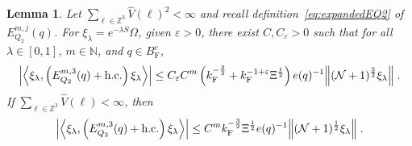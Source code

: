 \documentclass[12pt,a4paper]{article}
\numberwithin{equation}{section}
\newcommand{\NNN}{\mathbb{N}}
\newcommand{\1}{\mathbb{I}}
\newcommand{\F}{\mathrm{F}}
\newcommand{\Zstar}{\mathbb{Z}^3} %
\newcommand{\Z}{\mathbb{Z}}
\newcommand{\NN}{\mathcal{N}}
\newcommand{\half}{\frac{1}{2}}
\newcommand{\eva}[1]{\left\langle #1 \right\rangle}
\theoremstyle{plain}
\newtheorem{lemma}[theorem]{Lemma}
\theoremstyle{definition}
\theoremstyle{remark}
\theoremstyle{plain}
\theoremstyle{definition}
\theoremstyle{remark}
\begin{document}
\begin{lemma} \label{lem:EQ215}
Let $ \sum_{\ell \in \Zstar} \hat{V}(\ell)^2 < \infty $ and recall definition~\eqref{eq:expandedEQ2} of $ E_{Q_2}^{m,j}(q) $. For $\xi_\lambda = e^{-\lambda S} \Omega$, given $ \varepsilon > 0 $, there exist $ C, C_\varepsilon > 0 $ such that for all $ \lambda \in [0,1] $, $ m \in \NNN $, and $ q \in B_{\F}^c $,
\begin{align} \label{eq:estEQ215_Coulomb}
	\abs{\eva{\xi_\lambda,\left(E^{m,3}_{Q_2}(q) +\mathrm{h.c.}\right) \xi_\lambda }}
	\leq C_\varepsilon C^m \left( k_{\F}^{-\frac 32}
		+ k_{\F}^{-1 + \varepsilon} \Xi^\half \right)
		e(q)^{-1}
		\norm{(\NN+1)^{\frac 32} \xi_\lambda} \;.
\end{align}
If $ \sum_{\ell \in \Zstar} \hat{V}(\ell) < \infty $, then
\begin{align} \label{eq:estEQ215}
	\abs{\eva{\xi_\lambda,\left(E^{m,3}_{Q_2}(q) + \mathrm{h.c.}\right) \xi_\lambda }}
	\leq C^m k_{\F}^{-\frac{3}{2}} \Xi^{\half} e(q)^{-1}
		\norm{(\NN+1)^\half \xi_\lambda } \;.
\end{align}
\end{lemma}
\end{document}
